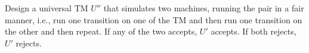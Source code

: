   Design a universal TM $U''$ that simulates two machines,
  running the pair in a fair manner, i.e., run one transition
  on one of the TM and then run one transition on the other
  and then repeat.
  If any of the two accepts, $U'$ accepts.
  If both rejects, $U'$ rejects.  
